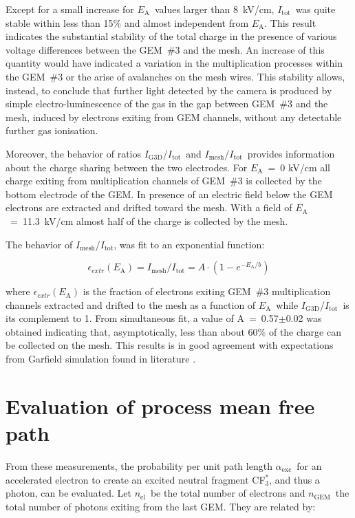 \documentclass[a4paper,11pt]{article}
\newcommand{\Itot}{$I_{\mathrm{tot}}$}
\newcommand{\Ig}  {$I_{\mathrm{G3D}}$}
\newcommand{\Ime}  {$I_{\mathrm{mesh}}$}
\newcommand{\Ea}  {$E_{\mathrm{A}}$}
\newcommand{\nel}  {$n_{\mathrm{el}}$}
\newcommand{\ngem}  {$n_{\mathrm{GEM}}$}
\newcommand{\aex}  {$\alpha_{\mathrm{exc}}$}
\begin{document}
Except for a small increase for \Ea\ values larger than 8~kV/cm, \Itot\ was quite stable within less than 15\% and almost independent from \Ea. This result indicates the substantial stability of the total charge in the presence of various voltage differences between the GEM~\#3 and the mesh. An increase of this quantity would have indicated a variation in the multiplication processes within the GEM~\#3 or the arise of avalanches on the mesh wires.
This stability allows, instead, to conclude that further light detected by the camera is produced by simple electro-luminescence of the gas in the gap between GEM~\#3 and the mesh, induced by electrons exiting from GEM channels, without any detectable further gas ionisation.

Moreover, the behavior of ratios  \Ig/\Itot\ and \Ime/\Itot\ provides information about the charge sharing between the two electrodes.
For \Ea~=~0 kV/cm all charge exiting from multiplication channels of GEM~\#3 is collected by the bottom electrode of the GEM. In presence of an electric field below the GEM electrons are extracted and drifted toward the mesh. With a field of \Ea~=~11.3~kV/cm almost half of the charge is collected by the mesh.

The behavior of \Ime /\Itot, was fit to an exponential function:

\begin{equation}
\epsilon_{extr}(E_{\mathrm{A}}) = I_{\mathrm{mesh}}/I_{\mathrm{tot}} = A\cdot(1-e^{-E_{\mathrm{A}}/b})
\end{equation}

where $\epsilon_{extr}(E_{\mathrm{A}})$ is the fraction
of electrons exiting GEM~\#3 multiplication channels extracted and drifted to
the mesh as a function of \Ea\ while \Ig/\Itot\ is its complement to 1.
From simultaneous fit, a value of A~=~0.57$\pm$0.02 was obtained indicating that, asymptotically, less than about 60\% of the charge can be collected on the mesh. This results is in good agreement with expectations from Garfield simulation found in literature \cite{bib:thesis, bib:Bonivento, bib:ieee_benci}.


\section{Evaluation of process mean free path}

From these measurements, the probability per unit path length \aex\ for an accelerated electron to create an excited neutral fragment CF$^*_3$, and thus a photon, can be evaluated. Let \nel\ be the total number of electrons and \ngem\ the total number of photons exiting from the last GEM. They are related by:
\end{document}
